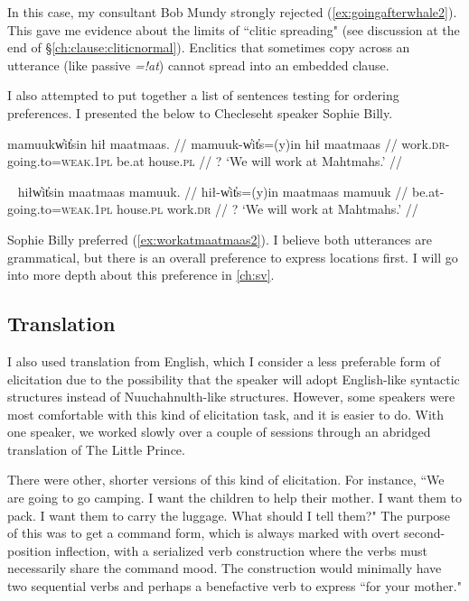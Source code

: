 \noindent In this case, my consultant Bob Mundy strongly rejected (\ref{ex:goingafterwhale2}). This gave me evidence about the limits of ``clitic spreading" (see discussion at the end of \S\ref{ch:clause:cliticnormal}). Enclitics that sometimes copy across an utterance (like passive \textit{=!at}) cannot spread into an embedded clause.

I also attempted to put together a list of sentences testing for ordering preferences. I presented the below to Checleseht speaker Sophie Billy.

\ex \label{ex:workatmaatmaas1}
\begingl
\glpreamble mamuukw̓it̓sin hił maatmaas. //
\gla mamuuk-w̓it̓s=(y)in hił maatmaas //
\glb work.\textsc{dr}-going.to=\textsc{weak.1pl} be.at house.\textsc{pl} //
\glft ? `We will work at Mahtmahs.' //
\endgl
\xe

\ex~ \label{ex:workatmaatmaas2}
\begingl
\glpreamble hiłw̓it̓sin maatmaas mamuuk. //
\gla hił-w̓it̓s=(y)in maatmaas mamuuk //
\glb be.at-going.to=\textsc{weak.1pl} house.\textsc{pl} work.\textsc{dr} //
\glft ? `We will work at Mahtmahs.' //
\endgl
\xe

\noindent Sophie Billy preferred (\ref{ex:workatmaatmaas2}). I believe both utterances are grammatical, but there is an overall preference to express locations first. I will go into more depth about this preference in \cref{ch:sv}.

\subsection{Translation}

I also used translation from English, which I consider a less preferable form of elicitation due to the possibility that the speaker will adopt English-like syntactic structures instead of Nuuchahnulth-like structures. However, some speakers were most comfortable with this kind of elicitation task, and it is easier to do. With one speaker, we worked slowly over a couple of sessions through an abridged translation of The Little Prince.

There were other, shorter versions of this kind of elicitation. For instance, ``We are going to go camping. I want the children to help their mother. I want them to pack. I want them to carry the luggage. What should I tell them?" The purpose of this was to get a command form, which is always marked with overt second-position inflection, with a serialized verb construction where the verbs must necessarily share the command mood. The construction would minimally have two sequential verbs and perhaps a benefactive verb to express ``for your mother."

